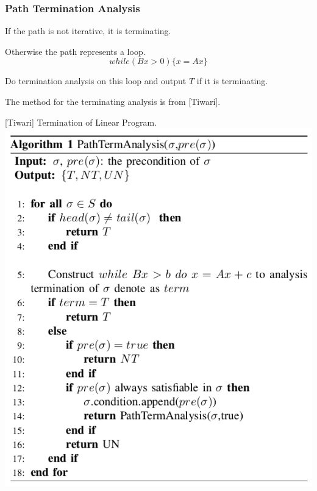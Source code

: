 \documentclass[11pt]{beamer}
\begin{document}
\begin{frame}\frametitle{Path Termination Analysis}
\begin{multicols}{2}
If the path is not iterative, it is terminating.

Otherwise the path represents a loop.
\[while(Bx > 0)\{x = Ax\}\]

Do termination analysis on this loop and output $T$ if it is terminating.

The method for the terminating analysis is from [Tiwari].

{\tiny[Tiwari] Termination of Linear Program.}
\includegraphics[scale=0.3]{algo1.png}

\end{multicols}
\end{frame}
\end{document}
